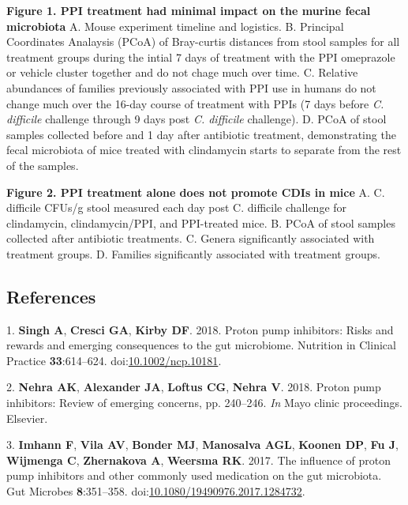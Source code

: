 \documentclass[11pt,]{article}
\begin{document}
\textbf{Figure 1. PPI treatment had minimal impact on the murine fecal
microbiota} A. Mouse experiment timeline and logistics. B. Principal
Coordinates Analaysis (PCoA) of Bray-curtis distances from stool samples
for all treatment groups during the intial 7 days of treatment with the
PPI omeprazole or vehicle cluster together and do not chage much over
time. C. Relative abundances of families previously associated with PPI
use in humans do not change much over the 16-day course of treatment
with PPIs (7 days before \emph{C. difficile} challenge through 9 days
post \emph{C. difficile} challenge). D. PCoA of stool samples collected
before and 1 day after antibiotic treatment, demonstrating the fecal
microbiota of mice treated with clindamycin starts to separate from the
rest of the samples.

\textbf{Figure 2. PPI treatment alone does not promote CDIs in mice} A.
C. difficile CFUs/g stool measured each day post C. difficile challenge
for clindamycin, clindamycin/PPI, and PPI-treated mice. B. PCoA of stool
samples collected after antibiotic treatments. C. Genera significantly
associated with treatment groups. D. Families significantly associated
with treatment groups.

\newpage

\subsection*{References}\label{references}

\hypertarget{refs}{}
\hypertarget{ref-Singh2018}{}
1. \textbf{Singh A}, \textbf{Cresci GA}, \textbf{Kirby DF}. 2018. Proton
pump inhibitors: Risks and rewards and emerging consequences to the gut
microbiome. Nutrition in Clinical Practice \textbf{33}:614--624.
doi:\href{https://doi.org/10.1002/ncp.10181}{10.1002/ncp.10181}.

\hypertarget{ref-nehra2018proton}{}
2. \textbf{Nehra AK}, \textbf{Alexander JA}, \textbf{Loftus CG},
\textbf{Nehra V}. 2018. Proton pump inhibitors: Review of emerging
concerns, pp. 240--246. \emph{In} Mayo clinic proceedings. Elsevier.

\hypertarget{ref-Imhann2017}{}
3. \textbf{Imhann F}, \textbf{Vila AV}, \textbf{Bonder MJ},
\textbf{Manosalva AGL}, \textbf{Koonen DP}, \textbf{Fu J},
\textbf{Wijmenga C}, \textbf{Zhernakova A}, \textbf{Weersma RK}. 2017.
The influence of proton pump inhibitors and other commonly used
medication on the gut microbiota. Gut Microbes \textbf{8}:351--358.
doi:\href{https://doi.org/10.1080/19490976.2017.1284732}{10.1080/19490976.2017.1284732}.
\end{document}
